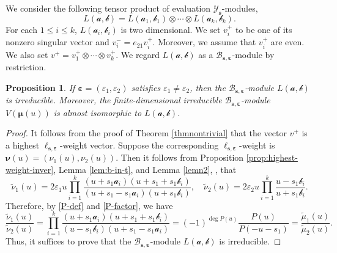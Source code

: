 \documentclass[11pt,reqno]{amsart}
\numberwithin{equation}{section}
\newtheorem{prop}[thm]{Proposition}
\theoremstyle{definition}
\theoremstyle{remark}
\newcommand{\mc}{\mathcal}
\newcommand{\tl}{\tilde}
\newcommand{\lle}{\leqslant}
\newcommand{\YMN}{{\mathscr{Y}_{\bm s}}}
\newcommand{\BMN}{{\mathscr{B}_{\bm s,\bm \ve}}}
\newcommand{\ve}{\varepsilon}
\newcommand{\s}{{\bm s}}
\begin{document}
We consider the following tensor product of evaluation $\YMN$-modules,
\[
L(\bm{\mc a,\mc b})=L(\mc a_1,\mc b_1)\otimes \cdots\otimes L(\mc a_k,\mc b_k).
\]
For each $1\lle i\lle k$, $L(\mc a_i,\mc b_i)$ is two dimensional. We set $v_i^+$ to be one of its nonzero singular vector and $v_i^-=e_{21}v_i^+$. Moreover, we assume that $v_i^+$ are even. We also set $v^+=v_1^+\otimes\cdots\otimes v_k^+$. We regard $L(\bm{\mc a,\mc b})$ as a $\BMN$-module by restriction.
\begin{prop}\label{prop=}
If $\bm\ve=(\ve_1,\ve_2)$ satisfies $\ve_1\ne \ve_2$, then the  $\BMN$-module $L(\bm{\mc a,\mc b})$ is irreducible. Moreover, the finite-dimensional irreducible $\BMN$-module $V(\bm\mu(u))$ is almost isomorphic to $L(\bm{\mc a,\mc b})$.
\end{prop}
\begin{proof}
It follows from the proof of Theorem \ref{thmnontrivial} that the vector $v^+$ is a highest $\ell_{\s,\bm\ve}$-weight vector. Suppose the corresponding $\ell_{\s,\bm\ve}$-weight is $\bm\nu(u)=(\nu_1(u),\nu_2(u))$. Then it follows from Proposition \ref{prop:highest-weight-inver}, Lemma \ref{lem:b-in-t}, and Lemma \ref{lemn2}, , that
\[
\tl \nu_1(u)=2\ve_1u\prod_{i=1}^k\frac{(u+s_1\mc a_i)(u+s_1+s_1\mc b_i)}{(u+s_1-s_1\mc a_i)(u+s_1\mc b_i)},\quad \tl \nu_2(u) = 2\ve_2u\prod_{i=1}^k\frac{u-s_1\mc b_i}{u+s_1\mc b_i}.
\]
Therefore, by \eqref{P-def} and \eqref{P-factor}, we have
\[
\frac{\tl \nu_1(u)}{\tl \nu_2(u)}=\prod_{i=1}^k\frac{(u+s_1\mc a_i)(u+s_1+s_1\mc b_i)}{(u-s_1\mc b_i)(u+s_1-s_1\mc a_i)}=(-1)^{\deg P(u)}\frac{P(u)}{P(-u-s_1)}=\frac{\tl \mu_1(u)}{\tl \mu_2(u)}.
\]
Thus, it suffices to prove that the  $\BMN$-module $L(\bm{\mc a,\mc b})$ is irreducible.


\end{proof}
\end{document}
